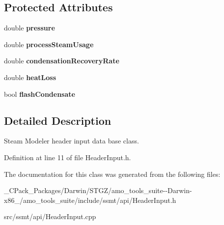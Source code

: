 \subsection*{Protected Attributes}
\begin{DoxyCompactItemize}
\item 
\mbox{\label{class_header_with_pressure_a9239a3091a58af0bc25e3126dc357c71}} 
double {\bfseries pressure}
\item 
\mbox{\label{class_header_with_pressure_a72b261806edb21592312b19f200e4871}} 
double {\bfseries process\+Steam\+Usage}
\item 
\mbox{\label{class_header_with_pressure_a91d26982cfb8621c9d1fae6538537a82}} 
double {\bfseries condensation\+Recovery\+Rate}
\item 
\mbox{\label{class_header_with_pressure_a2d4d9f9f3f958bd866fa48cf388fa669}} 
double {\bfseries heat\+Loss}
\item 
\mbox{\label{class_header_with_pressure_a0aa6d823a52374ffe8ba575953288164}} 
bool {\bfseries flash\+Condensate}
\end{DoxyCompactItemize}


\subsection{Detailed Description}
Steam Modeler header input data base class. 

Definition at line 11 of file Header\+Input.\+h.



The documentation for this class was generated from the following files\+:\begin{DoxyCompactItemize}
\item 
\+\_\+\+C\+Pack\+\_\+\+Packages/\+Darwin/\+S\+T\+G\+Z/amo\+\_\+tools\+\_\+suite-\/-\/\+Darwin-\/x86\+\_/amo\+\_\+tools\+\_\+suite/include/ssmt/api/Header\+Input.\+h\item 
src/ssmt/api/Header\+Input.\+cpp\end{DoxyCompactItemize}
